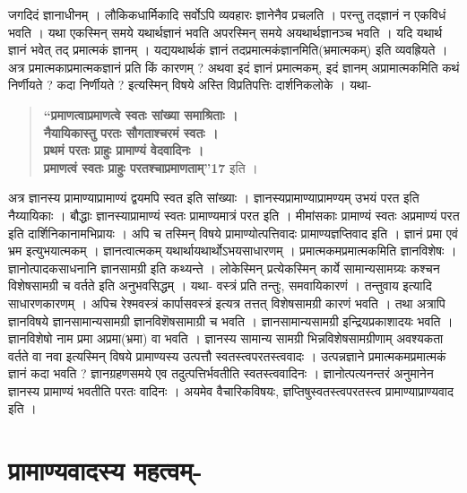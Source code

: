 जगदिदं ज्ञानाधीनम् । लौकिकधार्मिकादि सर्वोऽपि व्यवहारः ज्ञानेनैव प्रचलति । परन्तु तद्ज्ञानं न एकविधं भवति । यथा एकस्मिन् समये यथार्थज्ञानं भवति अपरस्मिन् समये अयथार्थज्ञानञ्च भवति । यदि यथार्थ ज्ञानं भवेत् तद् प्रमात्मकं ज्ञानम् । यद्ययथार्थकं ज्ञानं तदप्रमात्मकंज्ञानमिति(भ्रमात्मकम्) इति व्यवह्रियते । अत्र प्रमात्मकाप्रमात्मकज्ञानं प्रति किं कारणम् ? अथवा इदं ज्ञानं प्रमात्मकम्, इदं ज्ञानम् अप्रामात्मकमिति कथं निर्णीयते ? कदा निर्णीयते ? इत्यस्मिन् विषये अस्ति विप्रतिपत्तिः दार्शनिकलोके । यथा-
\begin{verse}
\textbf{“प्रमाणत्वाप्रमाणत्वे स्वतः सांख्या समाश्रिताः ।\\
नैयायिकास्तु परतः सौगताश्चरमं स्वतः ।\\
प्रथमं परतः प्राहुः प्रामाण्यं वेदवादिनः ।\\
प्रमाणत्वं स्वतः प्राहुः परतश्चाप्रमाणताम्”17} इति ।
\end{verse}
अत्र ज्ञानस्य प्रामाण्याप्रामाण्यं द्वयमपि स्वत इति सांख्याः । ज्ञानस्यप्रामाण्याप्रामण्यम् उभयं परत इति नैय्यायिकाः । बौद्धाः ज्ञानस्याप्रामाण्यं स्वतः प्रामाण्यमात्रं परत इति । मीमांसकाः प्रामाण्यं स्वतः अप्रमाण्यं परत इति दार्शिनिकानामभिप्रायः । अपि च तस्मिन् विषये प्रामाण्योत्पत्तिवादः प्रामाण्यज्ञप्तिवाद इति । ज्ञानं प्रमा एवं भ्रम इत्युभयात्मकम् । ज्ञानत्वात्मकम् यथार्थायथार्थोऽभयसाधारणम् । प्रमात्मकमप्रमात्मकमिति ज्ञानविशेषः । ज्ञानोत्पादकसाधनानि ज्ञानसामग्री इति कथ्यन्ते । लोकेस्मिन् प्रत्येकस्मिन् कार्ये सामान्यसामग्र्यः कश्चन विशेषसामग्री च वर्तते इति अनुभवसिद्धम् । यथा- वस्त्रं प्रति तन्तुः, समवायिकारणं । तन्तुवाय इत्यादि साधारणकारणम् । अपिच रेश्मवस्त्रं कार्पासवस्त्रं इत्यत्र तत्तत् विशेषसामग्री कारणं भवति । तथा अत्रापि ज्ञानविषये ज्ञानसामान्यसामग्री ज्ञानविशॆषसामाग्री च भवति । ज्ञानसामान्यसामग्री इन्द्रियप्रकाशादयः भवति । ज्ञानविशेषो नाम प्रमा अप्रमा(भ्रमा) वा भवति । ज्ञानस्य सामान्य सामग्री भिन्नविशेषसामग्रीणाम् अवश्यकता वर्तते वा नवा इत्यस्मिन् विषये प्रामाण्यस्य उत्पत्तौ स्वतस्त्वपरतस्त्ववादः । उत्पन्नज्ञाने प्रमात्मकमप्रमात्मकं ज्ञानं कदा भवति ? ज्ञानग्रहणसमये एव तदुत्पत्तिर्भवतीति स्वतस्त्ववादिनः । ज्ञानोत्पत्यनन्तरं अनुमानेन ज्ञानस्य प्रामाण्यं भवतीति परतः वादिनः । अयमेव वैचारिकविषयः, ज्ञप्तिषुस्वतस्त्वपरतस्त्व प्रामाण्याप्राण्यवाद इति ।

\section*{प्रामाण्यवादस्य महत्वम्-}

